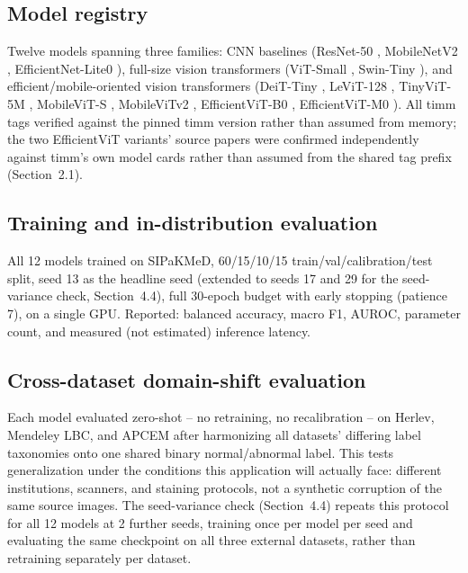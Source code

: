 \documentclass[runningheads]{llncs}
\begin{document}
\subsection{Model registry}

Twelve models spanning three families: CNN baselines (ResNet-50
\cite{he2016resnet}, MobileNetV2 \cite{sandler2018mobilenetv2},
EfficientNet-Lite0 \cite{tan2019efficientnet}), full-size vision
transformers (ViT-Small \cite{dosovitskiy2021vit}, Swin-Tiny
\cite{liu2021swin}), and efficient/mobile-oriented vision transformers
(DeiT-Tiny \cite{touvron2021deit}, LeViT-128 \cite{graham2021levit},
TinyViT-5M \cite{wu2022tinyvit}, MobileViT-S \cite{mehta2022mobilevit},
MobileViTv2 \cite{mehta2022mobilevitv2}, EfficientViT-B0
\cite{cai2023efficientvit}, EfficientViT-M0 \cite{liu2023efficientvit}).
All timm tags verified against the pinned timm version rather than assumed
from memory; the two EfficientViT variants' source papers were confirmed
independently against timm's own model cards rather than assumed from the
shared tag prefix (Section~2.1).

\subsection{Training and in-distribution evaluation}

All 12 models trained on SIPaKMeD, 60/15/10/15
train/val/calibration/test split, seed 13 as the headline seed (extended
to seeds 17 and 29 for the seed-variance check, Section~4.4), full
30-epoch budget with early stopping (patience 7), on a single GPU.
Reported: balanced accuracy, macro F1, AUROC, parameter count, and
measured (not estimated) inference latency.

\subsection{Cross-dataset domain-shift evaluation}

Each model evaluated zero-shot -- no retraining, no recalibration -- on
Herlev, Mendeley LBC, and APCEM after harmonizing all datasets' differing
label taxonomies onto one shared binary normal/abnormal label. This tests
generalization under the conditions this application will actually face:
different institutions, scanners, and staining protocols, not a synthetic
corruption of the same source images. The seed-variance check
(Section~4.4) repeats this protocol for all 12 models at 2 further seeds,
training once per model per seed and evaluating the same checkpoint on
all three external datasets, rather than retraining separately per
dataset.
\end{document}
